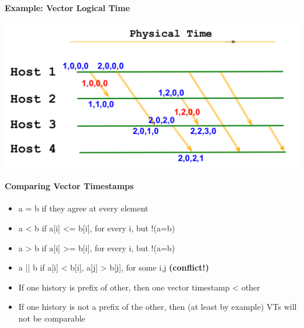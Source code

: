 \paragraph{Example: Vector Logical Time}
\includegraphics[scale=0.15]{graphics/ex-vector-logical-time.png}


\paragraph{Comparing Vector Timestamps}
\begin{itemize}
\item a = b \hspace{0.5cm} if they agree at every element
\item a < b \hspace{0.5cm} if a[i] <= b[i], for every i, but !(a=b)
\item a > b \hspace{0.5cm} if a[i] >= b[i], for every i, but !(a=b)
\item a || b \hspace{0.5cm} if a[i] < b[i], a[j] > b[j], for some i,j
  \textbf{(conflict!)}
\end{itemize}

\begin{itemize}
\item If one history is prefix of other, then one vector
  timestamp < other
\item If one history is not a prefix of the other, then
  (at least by example) VTs will not be comparable
\end{itemize}


